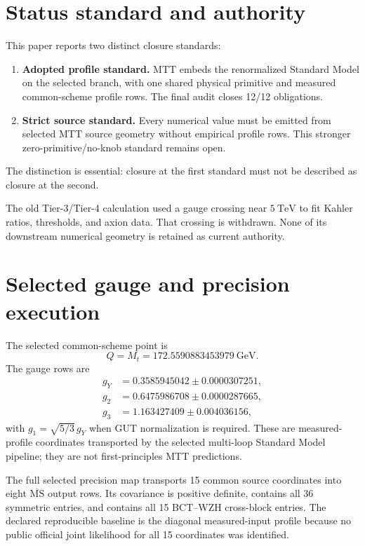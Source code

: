 \documentclass[11pt]{article}
\begin{document}
\section{Status standard and authority}

This paper reports two distinct closure standards:
\begin{enumerate}
\item \textbf{Adopted profile standard.} MTT embeds the renormalized Standard
Model on the selected branch, with one shared physical primitive and measured
common-scheme profile rows. The final audit closes 12/12 obligations.
\item \textbf{Strict source standard.} Every numerical value must be emitted
from selected MTT source geometry without empirical profile rows. This stronger
zero-primitive/no-knob standard remains open.
\end{enumerate}
The distinction is essential: closure at the first standard must not be
described as closure at the second.

The old Tier-3/Tier-4 calculation used a gauge crossing near $5~\mathrm{TeV}$
to fit Kahler ratios, thresholds, and axion data. That crossing is withdrawn.
None of its downstream numerical geometry is retained as current authority.

\section{Selected gauge and precision execution}

The selected common-scheme point is
\[
Q=M_t=172.5590883453979~\mathrm{GeV}.
\]
The gauge rows are
\begin{align}
g_Y&=0.3585945042\pm0.0000307251,\\
g_2&=0.6475986708\pm0.0000287665,\\
g_3&=1.163427409\pm0.004036156,
\end{align}
with $g_1=\sqrt{5/3}\,g_Y$ when GUT normalization is required. These are
measured-profile coordinates transported by the selected multi-loop Standard
Model pipeline; they are not first-principles MTT predictions.

The full selected precision map transports 15 common source coordinates into
eight $\overline{\mathrm{MS}}$ output rows. Its covariance is positive definite,
contains all 36 symmetric entries, and contains all 15 BCT--WZH cross-block
entries. The declared reproducible baseline is the diagonal measured-input
profile because no public official joint likelihood for all 15 coordinates was
identified.
\end{document}
